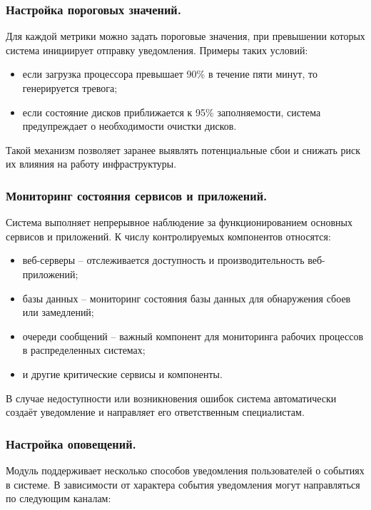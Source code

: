 \subsubsection{Настройка пороговых значений.}  
Для каждой метрики можно задать пороговые значения, при превышении которых система инициирует отправку уведомления. Примеры таких условий:

\begin{itemize}
    \item если загрузка процессора превышает 90\% в течение пяти минут, то генерируется тревога;
    \item если состояние дисков приближается к 95\% заполняемости, система предупреждает о необходимости очистки дисков.
\end{itemize}

Такой механизм позволяет заранее выявлять потенциальные сбои и снижать риск их влияния на работу инфраструктуры.

\subsubsection{Мониторинг состояния сервисов и приложений.}  
Система выполняет непрерывное наблюдение за функционированием основных сервисов и приложений. К числу контролируемых компонентов относятся:

\begin{itemize}
    \item веб-серверы -- отслеживается доступность и производительность веб-приложений;
    \item базы данных -- мониторинг состояния базы данных для обнаружения сбоев или замедлений;
    \item очереди сообщений -- важный компонент для мониторинга рабочих процессов в распределенных системах;
    \item и другие критические сервисы и компоненты.
\end{itemize}

В случае недоступности или возникновения ошибок система автоматически создаёт уведомление и направляет его ответственным специалистам.

\subsubsection{Настройка оповещений.}  
Модуль поддерживает несколько способов уведомления пользователей о событиях в системе. В зависимости от характера события уведомления могут направляться по следующим каналам:

